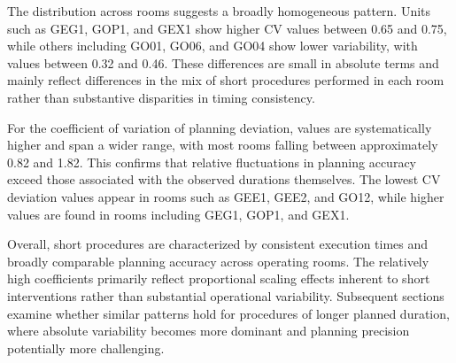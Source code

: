 \documentclass[
]{article}
\begin{document}
The distribution across rooms suggests a broadly homogeneous pattern.
Units such as GEG1, GOP1, and GEX1 show higher CV values between 0.65
and 0.75, while others including GO01, GO06, and GO04 show lower
variability, with values between 0.32 and 0.46. These differences are
small in absolute terms and mainly reflect differences in the mix of
short procedures performed in each room rather than substantive
disparities in timing consistency.

For the coefficient of variation of planning deviation, values are
systematically higher and span a wider range, with most rooms falling
between approximately 0.82 and 1.82. This confirms that relative
fluctuations in planning accuracy exceed those associated with the
observed durations themselves. The lowest CV deviation values appear in
rooms such as GEE1, GEE2, and GO12, while higher values are found in
rooms including GEG1, GOP1, and GEX1.

Overall, short procedures are characterized by consistent execution
times and broadly comparable planning accuracy across operating rooms.
The relatively high coefficients primarily reflect proportional scaling
effects inherent to short interventions rather than substantial
operational variability. Subsequent sections examine whether similar
patterns hold for procedures of longer planned duration, where absolute
variability becomes more dominant and planning precision potentially
more challenging.
\end{document}
